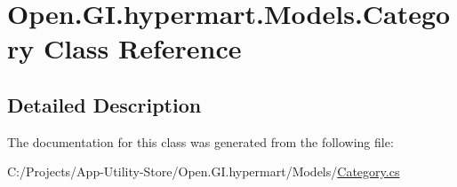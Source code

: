 \hypertarget{class_open_1_1_g_i_1_1hypermart_1_1_models_1_1_category}{}\section{Open.\+G\+I.\+hypermart.\+Models.\+Category Class Reference}
\label{class_open_1_1_g_i_1_1hypermart_1_1_models_1_1_category}


 




\subsection{Detailed Description}




The documentation for this class was generated from the following file\+:\begin{DoxyCompactItemize}
\item 
C\+:/\+Projects/\+App-\/\+Utility-\/\+Store/\+Open.\+G\+I.\+hypermart/\+Models/\hyperlink{_category_8cs}{Category.\+cs}\end{DoxyCompactItemize}
